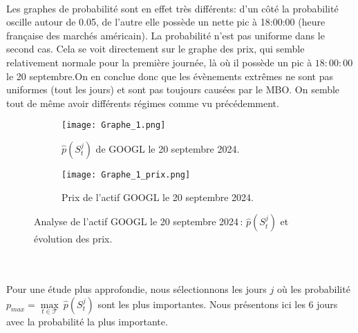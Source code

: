 \documentclass[12pt,a4paper]{article}
\theoremstyle{definition}
\theoremstyle{remark}
\begin{document}
\\
Les graphes de probabilité sont en effet très différents: d'un côté la probabilité oscille autour de 0.05, de l'autre elle possède un nette pic à 18:00:00 (heure française des marchés américain). La probabilité n'est pas uniforme dans le second cas. Cela se voit directement sur le graphe des prix, qui semble relativement normale pour la première journée, là où il possède un pic à $18:00:00$ le 20 septembre.On en conclue donc que les évènements extrêmes ne sont pas uniformes (tout les jours) et sont pas toujours causées par le MBO. On semble tout de même avoir différents régimes comme vu précédemment.
\begin{figure}[h!]
    \centering
    \begin{subfigure}[b]{0.48\textwidth}
        \centering
        \texttt{[image: Graphe\_1.png]}
        \caption{$\hat{p}(S_t^j)$ de GOOGL le 20 septembre 2024.}
        \label{fig:graphe1}
    \end{subfigure}
    \hfill
    \begin{subfigure}[b]{0.48\textwidth}
        \centering
        \texttt{[image: Graphe\_1\_prix.png]}
        \caption{Prix de l'actif GOOGL le 20 septembre  2024.}
        \label{fig:graphe2}
    \end{subfigure}

    \caption{Analyse de l'actif GOOGL le 20 septembre  2024 : $\hat{p}(S_t^j)$ et évolution des prix.}
    \label{fig:side_by_side}
\end{figure}
\\
\\
Pour une étude plus approfondie, nous sélectionnons les jours $j$ où les probabilité $p_{max} = \underset{t\in \mathcal{T}}{\max}\ \hat{p}(S_t^j)$ sont les plus importantes.  Nous présentons ici les 6 jours avec la probabilité la plus importante.
\\
\\
\end{document}
